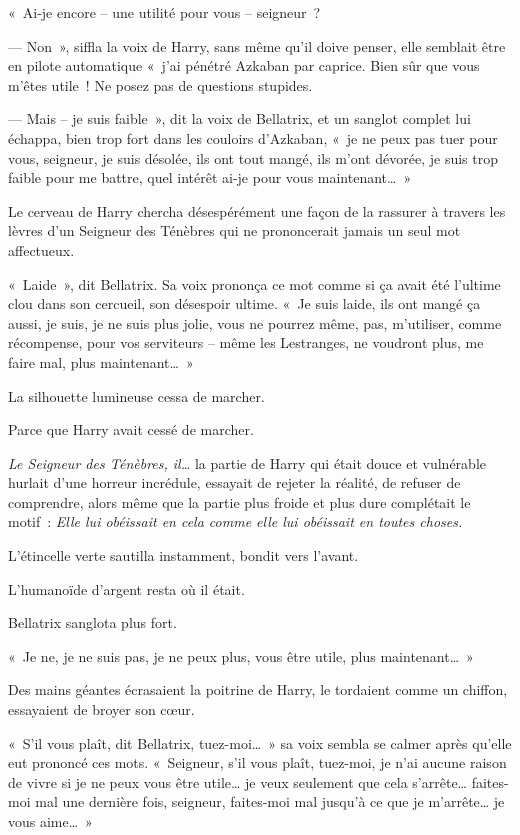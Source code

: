 «~Ai-je encore -- une utilité pour vous -- seigneur~?

--- Non~», siffla la voix de Harry, sans même qu'il doive penser, elle semblait être en pilote automatique «~j'ai pénétré Azkaban par caprice. Bien sûr que vous m'êtes utile~! Ne posez pas de questions stupides.

--- Mais -- je suis faible~», dit la voix de Bellatrix, et un sanglot complet lui échappa, bien trop fort dans les couloirs d'Azkaban, «~je ne peux pas tuer pour vous, seigneur, je suis désolée, ils ont tout mangé, ils m'ont dévorée, je suis trop faible pour me battre, quel intérêt ai-je pour vous maintenant…~»

Le cerveau de Harry chercha désespérément une façon de la rassurer à travers les lèvres d'un Seigneur des Ténèbres qui ne prononcerait jamais un seul mot affectueux.

«~Laide~», dit Bellatrix. Sa voix prononça ce mot comme si ça avait été l'ultime clou dans son cercueil, son désespoir ultime. «~Je suis laide, ils ont mangé ça aussi, je suis, je ne suis plus jolie, vous ne pourrez même, pas, m'utiliser, comme récompense, pour vos serviteurs -- même les Lestranges, ne voudront plus, me faire mal, plus maintenant…~»

La silhouette lumineuse cessa de marcher.

Parce que Harry avait cessé de marcher.

\emph{Le Seigneur des Ténèbres, il…} la partie de Harry qui était douce et vulnérable hurlait d'une horreur incrédule, essayait de rejeter la réalité, de refuser de comprendre, alors même que la partie plus froide et plus dure complétait le motif~: \emph{Elle lui obéissait en cela comme elle lui obéissait en toutes choses.}

L'étincelle verte sautilla instamment, bondit vers l'avant.

L'humanoïde d'argent resta où il était.

Bellatrix sanglota plus fort.

«~Je ne, je ne suis pas, je ne peux plus, vous être utile, plus maintenant…~»

Des mains géantes écrasaient la poitrine de Harry, le tordaient comme un chiffon, essayaient de broyer son cœur.

«~S'il vous plaît, dit Bellatrix, tuez-moi…~» sa voix sembla se calmer après qu'elle eut prononcé ces mots. «~Seigneur, s'il vous plaît, tuez-moi, je n'ai aucune raison de vivre si je ne peux vous être utile… je veux seulement que cela s'arrête… faites-moi mal une dernière fois, seigneur, faites-moi mal jusqu'à ce que je m'arrête… je vous aime…~»

